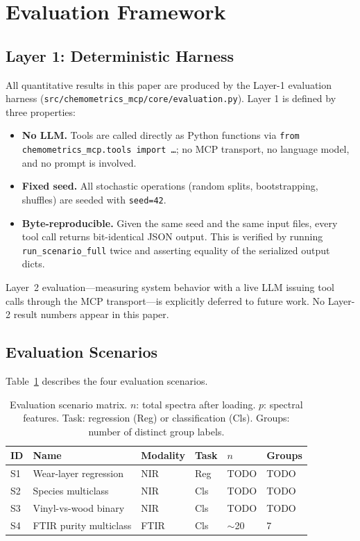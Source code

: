 
\section{Evaluation Framework}
\label{sec:evaluation}

\subsection{Layer 1: Deterministic Harness}

All quantitative results in this paper are produced by the Layer-1 evaluation
harness (\texttt{src/chemometrics\_mcp/core/evaluation.py}).
Layer 1 is defined by three properties:
\begin{itemize}
  \item \textbf{No LLM.} Tools are called directly as Python functions via
    \texttt{from chemometrics\_mcp.tools import \ldots}; no MCP transport,
    no language model, and no prompt is involved.
  \item \textbf{Fixed seed.} All stochastic operations (random splits,
    bootstrapping, shuffles) are seeded with \texttt{seed=42}.
  \item \textbf{Byte-reproducible.} Given the same seed and the same input
    files, every tool call returns bit-identical JSON output.
    This is verified by running \texttt{run\_scenario\_full} twice and
    asserting equality of the serialized output dicts.
\end{itemize}

Layer~2 evaluation---measuring system behavior with a live LLM issuing tool
calls through the MCP transport---is explicitly deferred to future work.
No Layer-2 result numbers appear in this paper.

\subsection{Evaluation Scenarios}

Table~\ref{tab:scenarios} describes the four evaluation scenarios.

\begin{table}[ht]
  \centering
  \caption{Evaluation scenario matrix. $n$: total spectra after loading.
    $p$: spectral features. Task: regression (Reg) or classification (Cls).
    Groups: number of distinct group labels.}
  \label{tab:scenarios}
  \begin{tabular}{llllll}
    \toprule
    ID & Name & Modality & Task & $n$ & Groups \\
    \midrule
    S1 & Wear-layer regression   & NIR  & Reg  & TODO & TODO \\
    S2 & Species multiclass      & NIR  & Cls  & TODO & TODO \\
    S3 & Vinyl-vs-wood binary    & NIR  & Cls  & TODO & TODO \\
    S4 & FTIR purity multiclass  & FTIR & Cls  & $\sim$20 & 7 \\
    \bottomrule
  \end{tabular}
\end{table}


